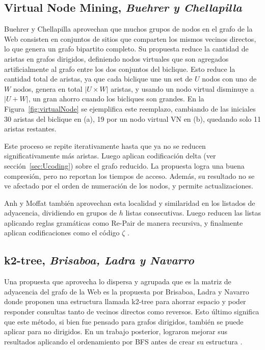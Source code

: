 \subsection{Virtual Node Mining, \textit{Buehrer y Chellapilla}}
Buehrer y Chellapilla \cite{BuehrerChellapilla} aprovechan que muchos grupos de nodos en el grafo de la Web consisten en conjuntos de sitios que comparten los mismos vecinos directos, lo que genera un grafo bipartito completo. Su propuesta reduce la cantidad de aristas en grafos dirigidos, definiendo nodos virtuales que son agregados artificialmente al grafo entre los dos conjuntos del biclique. Esto reduce la cantidad total de aristas, ya que cada biclique une un set de $U$ nodos con uno de $W$ nodos, genera en total $|U \times W|$ aristas, y usando un nodo virtual disminuye a $|U + W|$, un gran ahorro cuando los bicliques son grandes. En la Figura~\ref{fig:virtualNode} se ejemplifica este reemplazo, cambiando de las iniciales 30 aristas del biclique en (a), 19 por un nodo virtual VN en (b), quedando solo 11 aristas restantes.



Este proceso se repite iterativamente hasta que ya no se reducen significativamente más aristas. Luego aplican codificación delta (ver sección~\ref{sec:Ucoding}) sobre el grafo reducido. La propuesta logra una buena compresión, pero no reportan los tiempos de acceso. Además, su resultado no se ve afectado por el orden de numeración de los nodos, y permite actualizaciones.

Anh y Moffat \cite{anh2010local} también aprovechan esta localidad y similaridad en los listados de adyacencia, dividiendo en grupos de $h$ listas consecutivas. Luego reducen las listas aplicando reglas gramáticas como Re-Pair \cite{larsson2000off} de manera recursiva, y finalmente aplican codificaciones como el código $\zeta$ \cite{boldi2005codes}.


\subsection{k2-tree, \textit{Brisaboa, Ladra y Navarro}}
Una propuesta que aprovecha lo dispersa y agrupada que es la matriz de adyacencia del grafo de la Web es la propuesta por Brisaboa, Ladra y Navarro \cite{brisaboa2009k} donde proponen una estructura llamada k2-tree para ahorrar espacio y poder responder consultas tanto de vecinos directos como reversos. Esto último significa que este método, si bien fue pensado para grafos dirigidos, también se puede aplicar para no dirigidos. En un trabajo posterior, lograron mejorar sus resultados aplicando el ordenamiento por BFS antes de crear su estructura \cite{brisaboa2014compact}.

